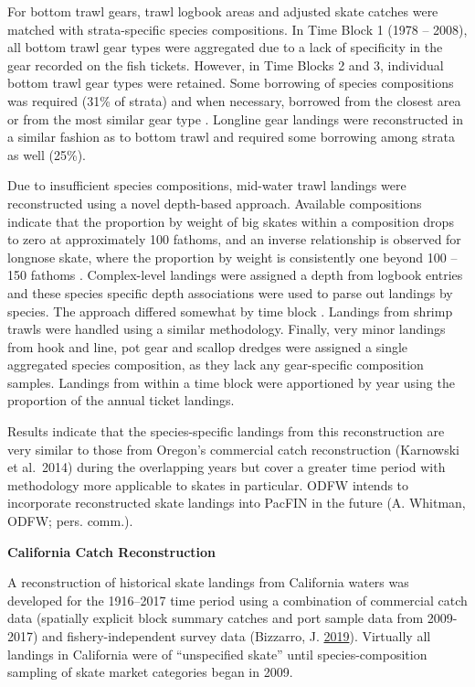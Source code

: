 \documentclass[12pt,]{article}
\begin{document}
For bottom trawl gears, trawl logbook areas and adjusted skate catches
were matched with strata-specific species compositions. In Time Block 1
(1978 -- 2008), all bottom trawl gear types were aggregated due to a
lack of specificity in the gear recorded on the fish tickets. However,
in Time Blocks 2 and 3, individual bottom trawl gear types were
retained. Some borrowing of species compositions was required (31\% of
strata) and when necessary, borrowed from the closest area or from the
most similar gear type . Longline gear landings were reconstructed in a
similar fashion as to bottom trawl and required some borrowing among
strata as well (25\%).

Due to insufficient species compositions, mid-water trawl landings were
reconstructed using a novel depth-based approach. Available compositions
indicate that the proportion by weight of big skates within a
composition drops to zero at approximately 100 fathoms, and an inverse
relationship is observed for longnose skate, where the proportion by
weight is consistently one beyond 100 -- 150 fathoms . Complex-level
landings were assigned a depth from logbook entries and these species
specific depth associations were used to parse out landings by species.
The approach differed somewhat by time block . Landings from shrimp
trawls were handled using a similar methodology. Finally, very minor
landings from hook and line, pot gear and scallop dredges were assigned
a single aggregated species composition, as they lack any gear-specific
composition samples. Landings from within a time block were apportioned
by year using the proportion of the annual ticket landings.

Results indicate that the species-specific landings from this
reconstruction are very similar to those from Oregon's commercial catch
reconstruction (Karnowski et al.~2014) during the overlapping years but
cover a greater time period with methodology more applicable to skates
in particular. ODFW intends to incorporate reconstructed skate landings
into PacFIN in the future (A. Whitman, ODFW; pers. comm.).

\textbf{California Catch Reconstruction}

A reconstruction of historical skate landings from California waters was
developed for the 1916--2017 time period using a combination of
commercial catch data (spatially explicit block summary catches and port
sample data from 2009-2017) and fishery-independent survey data
(Bizzarro, J. \protect\hyperlink{ref-Bizzarro2019}{2019}). Virtually all
landings in California were of ``unspecified skate'' until
species-composition sampling of skate market categories began in 2009.
\end{document}
